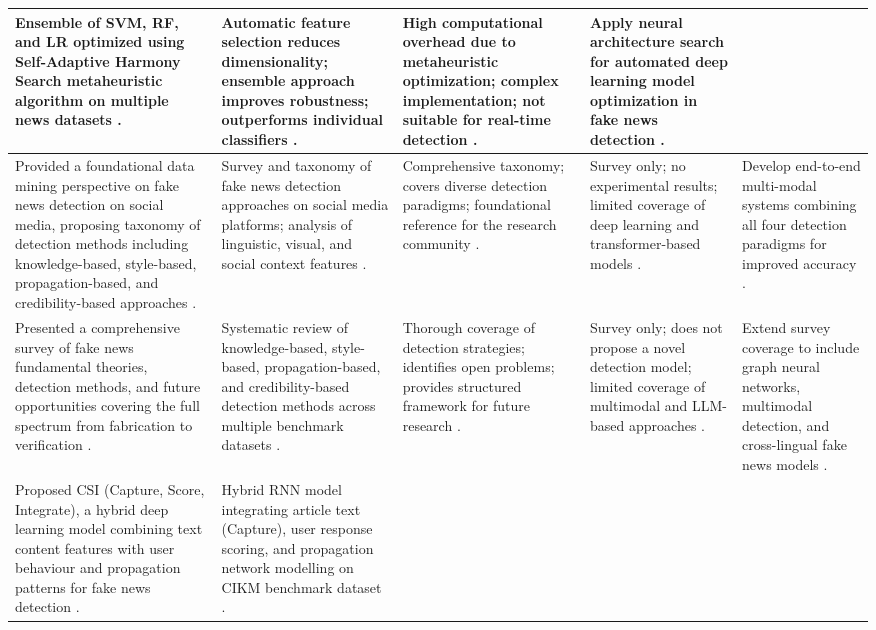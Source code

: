 \documentclass[runningheads]{llncs}
\begin{document}
\begin{longtable}{|p{}|p{}|p{}|p{}|p{}|}
Ensemble of SVM, RF, and LR optimized using Self-Adaptive Harmony Search metaheuristic algorithm on multiple news datasets \cite{Huang2020FakeNews}. &
Automatic feature selection reduces dimensionality; ensemble approach improves robustness; outperforms individual classifiers \cite{Huang2020FakeNews}. &
High computational overhead due to metaheuristic optimization; complex implementation; not suitable for real-time detection \cite{Huang2020FakeNews}. &
Apply neural architecture search for automated deep learning model optimization in fake news detection \cite{Huang2020FakeNews}. \\ \hline
Provided a foundational data mining perspective on fake news detection on social media, proposing taxonomy of detection methods including knowledge-based, style-based, propagation-based, and credibility-based approaches \cite{Shu2017FakeNewsDetection}. &
Survey and taxonomy of fake news detection approaches on social media platforms; analysis of linguistic, visual, and social context features \cite{Shu2017FakeNewsDetection}. &
Comprehensive taxonomy; covers diverse detection paradigms; foundational reference for the research community \cite{Shu2017FakeNewsDetection}. &
Survey only; no experimental results; limited coverage of deep learning and transformer-based models \cite{Shu2017FakeNewsDetection}. &
Develop end-to-end multi-modal systems combining all four detection paradigms for improved accuracy \cite{Shu2017FakeNewsDetection}. \\ \hline
Presented a comprehensive survey of fake news fundamental theories, detection methods, and future opportunities covering the full spectrum from fabrication to verification \cite{Zhou2020Survey}. &
Systematic review of knowledge-based, style-based, propagation-based, and credibility-based detection methods across multiple benchmark datasets \cite{Zhou2020Survey}. &
Thorough coverage of detection strategies; identifies open problems; provides structured framework for future research \cite{Zhou2020Survey}. &
Survey only; does not propose a novel detection model; limited coverage of multimodal and LLM-based approaches \cite{Zhou2020Survey}. &
Extend survey coverage to include graph neural networks, multimodal detection, and cross-lingual fake news models \cite{Zhou2020Survey}. \\ \hline
Proposed CSI (Capture, Score, Integrate), a hybrid deep learning model combining text content features with user behaviour and propagation patterns for fake news detection \cite{Ruchansky2017CSI}. &
Hybrid RNN model integrating article text (Capture), user response scoring, and propagation network modelling on CIKM benchmark dataset \cite{Ruchansky2017CSI}. &

\end{longtable}
\end{document}
